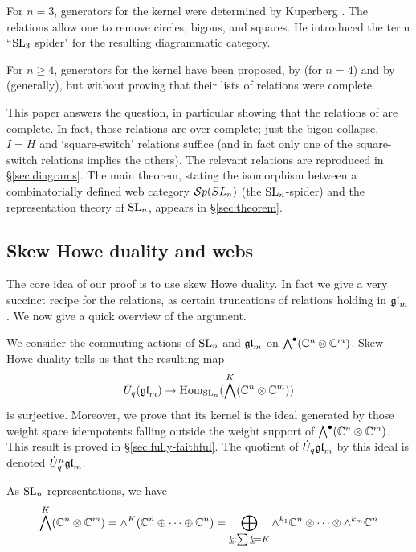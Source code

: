 \documentclass[11pt,leqno]{article}
\begin{document}
For $n=3$, generators for the kernel were determined by Kuperberg \cite{MR1403861}.  The relations allow one to remove circles, bigons, and squares.  He introduced the term ``${\rm{SL}}_3$ spider" for the resulting diagrammatic category.

For $n \geq 4$, generators for the kernel have been proposed, by \cite{math.QA/0310143} (for $n=4$) and by \cite{0704.1503} (generally), but without proving that their lists of relations were complete.

This paper answers the question, in particular showing that the relations of \cite{0704.1503} are complete. In fact, those relations are over complete; just the bigon collapse, $I=H$ and `square-switch' relations suffice (and in fact only one of the square-switch relations implies the others). The relevant relations are reproduced in \S\ref{sec:diagrams}.
The main theorem, stating the isomorphism between a combinatorially defined web category ${\mathcal{S}p}(SL_n)$ (the ${\rm{SL}}_n $-spider) and the representation theory of ${\rm{SL}}_n$, appears in \S \ref{sec:theorem}.


\subsection{Skew Howe duality and webs}
The core idea of our proof is to use skew Howe duality.  In fact we give a very succinct recipe for the relations, as certain truncations of relations holding in ${\mathfrak{gl}}_m$.  We now give a quick overview of the argument.

We consider the commuting actions of $ {\rm{SL}}_n $ and $ {\mathfrak{gl}}_m $ on $\bigwedge^\bullet(\mathbb{C}^n \otimes \mathbb{C}^m)$.  Skew Howe duality tells us that the resulting map
\begin{equation}
\dot{{{U}}}_q({\mathfrak{gl}}_m) \rightarrow \operatorname{Hom}_{{\rm{SL}}_n}(\bigwedge^K(\mathbb{C}^n \otimes \mathbb{C}^m))
\end{equation}
is surjective.  Moreover, we prove that its kernel is the ideal generated by those weight space idempotents falling outside the weight support of $\bigwedge^\bullet(\mathbb C^n \otimes \mathbb C^m)$.  This result is proved in \S \ref{sec:fully-faithful}.  The quotient of $ \dot{{{U}}}_q{\mathfrak{gl}}_m $ by this ideal is denoted $\dot{{{U}}}_q^n{\mathfrak{gl}}_m$.

As ${\rm{SL}}_n$-representations, we have
\begin{equation*}
\bigwedge^K(\mathbb C^n \otimes \mathbb C^m)  = \wedge^K(\mathbb C^n \oplus \cdots \oplus \mathbb C^n)
         = \bigoplus_{\underline{k}: \sum \underline{k} = K} \wedge^{k_1} \mathbb C^n \otimes \cdots \otimes \wedge^{k_m} {\mathbb{C}}^n
\end{equation*}
\end{document}

